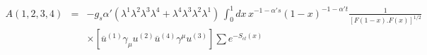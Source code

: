 \begin{equation}
\begin{array}{lll}
A(1,2,3,4) & = & -g_{s}\alpha '(\lambda ^{1}\lambda ^{2}\lambda ^{3}\lambda ^{4}+\lambda ^{4}\lambda ^{3}\lambda ^{2}\lambda ^{1})\, \int ^{1}_{0}dx\, x^{-1-\alpha 's}(1-x)^{-1-\alpha 't}\frac{1}{[F(1-x).F(x)]^{1/2}}\\
 &  & \times \left[ \overline{u}^{(1)}\gamma _{\mu }u^{(2)}\overline{u}^{(4)}\gamma ^{\mu }u^{(3)}\right]\sum e^{-S_{cl}(x)}
\end{array}
\end{equation}

